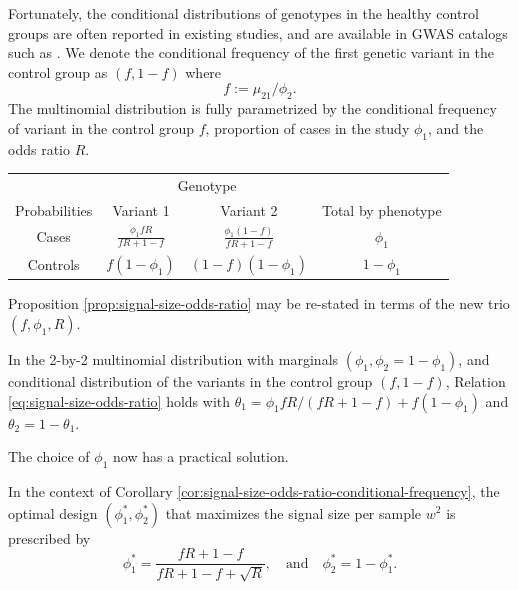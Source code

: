 Fortunately, the conditional distributions of genotypes in the healthy control groups are often reported in existing studies, and are available in GWAS catalogs such as \cite{macarthur2016new}.
We denote the conditional frequency of the first genetic variant in the control group as $(f, 1-f)$ where
$$
f := \mu_{21} / \phi_2.
$$
The multinomial distribution is fully parametrized by the conditional frequency of variant in the control group $f$, proportion of cases in the study $\phi_1$, and the odds ratio $R$.
\begin{center}
    \begin{tabular}{cccc}
    \hline
    & \multicolumn{2}{c}{Genotype} \\
    \cline{2-3}
    Probabilities & Variant 1 & Variant 2 & Total by phenotype \\
    \hline
    Cases & $\frac{\phi_1fR}{fR+1-f}$ & $\frac{\phi_1(1-f)}{fR+1-f}$ & $\phi_1$ \\
    Controls & $f(1-\phi_1)$ & $(1-f)(1-\phi_1)$ & $1-\phi_1$ \\
    \hline
    \end{tabular}
\end{center}
Proposition \ref{prop:signal-size-odds-ratio} may be re-stated in terms of the new trio $(f, \phi_1, R)$.


\begin{corollary} \label{cor:signal-size-odds-ratio-conditional-frequency}
In the 2-by-2 multinomial distribution with marginals $(\phi_1, \phi_2 = 1-\phi_1)$, and conditional distribution of the variants in the control group $(f, 1-f)$,
Relation \eqref{eq:signal-size-odds-ratio} holds with $\theta_1 = {\phi_1fR}/{(fR+1-f)} + f(1-\phi_1)$ and $\theta_2 = 1-\theta_1$.
\end{corollary} 

The choice of $\phi_1$ now has a practical solution.

\begin{corollary} \label{cor:optimal-design}
In the context of Corollary \ref{cor:signal-size-odds-ratio-conditional-frequency},
the optimal design $(\phi^*_1, \phi^*_2)$ that maximizes the signal size per sample $w^2$ is prescribed by
\begin{equation} \label{eq:optimal-design}
    \phi_1^* = \frac{fR+1-f}{fR+1-f+\sqrt{R}}, \quad\text{and}\quad 
    \phi_2^* = 1-\phi_1^*.
\end{equation}
\end{corollary} 

